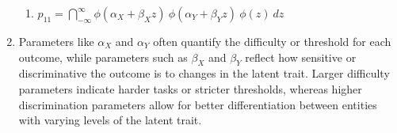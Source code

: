 \begin{enumerate}
\begin{enumerate}
        \item
        $
            p_{11}
            = \dint ^{\infty} _{-\infty} \phi(\alpha_X + \beta_X z)\ \phi(\alpha_Y + \beta_Y z)\ \phi(z)\ dz
        $
        \hfill \cite{statistics/book/Statistics-for-Data-Scientists/Maurits-Kaptein}
    \end{enumerate}

    \item Parameters like $\alpha_X$ and $\alpha_Y$ often quantify the difficulty or threshold for each outcome, while parameters such as  $\beta_X$ and $\beta_Y$ reflect how sensitive or discriminative the outcome is to changes in the latent trait.
    Larger difficulty parameters indicate harder tasks or stricter thresholds, whereas higher discrimination parameters allow for better differentiation between entities with varying levels of the latent trait.
    \hfill \cite{statistics/book/Statistics-for-Data-Scientists/Maurits-Kaptein, common/online/chatgpt}
\end{enumerate}












